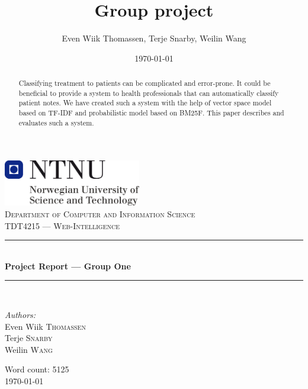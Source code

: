 \documentclass[11pt,a4paper]{report}
\title{Group project}
\author{Even Wiik Thomassen, Terje Snarby, Weilin Wang}
\date{\today}
\begin{document}
\begin{titlepage}
\begin{center}
\includegraphics[width=0.45\textwidth]{./img/NTNU-logo.png}\\[5cm]
\textsc{\large Department of Computer and Information Science}\\[0.2cm]
\textsc{\Large TDT4215 --- Web-Intelligence}\\[0.5cm]

\rule{\linewidth}{0.2mm} \\[0.4cm]
{ \LARGE \bfseries Project Report --- Group One}\\[0.2cm]
\rule{\linewidth}{0.2mm} \\[1.5cm]

\begin{minipage}{0.4\textwidth}
\begin{flushleft} \large
\emph{Authors:}\\
Even Wiik \textsc{Thomassen}\\
Terje \textsc{Snarby}\\
Weilin \textsc{Wang}
\end{flushleft}
\end{minipage}

\vfill
{\large Word count: 5125}\\[0.2cm]
{\large \today}
\end{center}
\end{titlepage}


\begin{abstract}
Classifying treatment to patients can be complicated and error-prone. It could be beneficial to provide a system to health professionals that can automatically classify patient notes. We have created such a system with the help of vector space model based on TF-IDF and probabilistic model based on BM25F. This paper describes and evaluates such a system.
\end{abstract}


\clearpage
{}
{}
\tableofcontents
\end{document}
